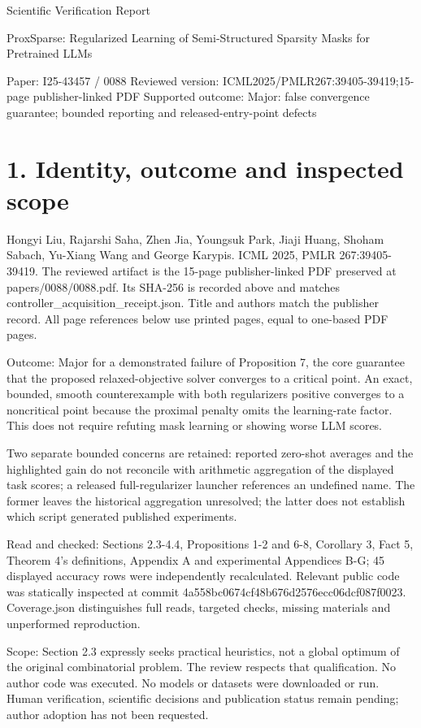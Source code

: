 \documentclass[10pt]{article}
\begin{document}
Scientific Verification Report\par
ProxSparse: Regularized Learning of Semi-Structured Sparsity Masks for Pretrained LLMs\par
Paper: I25-43457 / 0088
Reviewed version: ICML2025/PMLR267:39405-39419;15-page publisher-linked PDF
Supported outcome: Major: false convergence guarantee; bounded reporting and released-entry-point defects\par
\section*{1. Identity, outcome and inspected scope}
Hongyi Liu, Rajarshi Saha, Zhen Jia, Youngsuk Park, Jiaji Huang, Shoham Sabach, Yu-Xiang Wang and George Karypis. ICML 2025, PMLR 267:39405-39419. The reviewed artifact is the 15-page publisher-linked PDF preserved at papers/0088/0088.pdf. Its SHA-256 is recorded above and matches controller\_acquisition\_receipt.json. Title and authors match the publisher record. All page references below use printed pages, equal to one-based PDF pages.\par
Outcome: Major for a demonstrated failure of Proposition 7, the core guarantee that the proposed relaxed-objective solver converges to a critical point. An exact, bounded, smooth counterexample with both regularizers positive converges to a noncritical point because the proximal penalty omits the learning-rate factor. This does not require refuting mask learning or showing worse LLM scores.\par
Two separate bounded concerns are retained: reported zero-shot averages and the highlighted gain do not reconcile with arithmetic aggregation of the displayed task scores; a released full-regularizer launcher references an undefined name. The former leaves the historical aggregation unresolved; the latter does not establish which script generated published experiments.\par
Read and checked: Sections 2.3-4.4, Propositions 1-2 and 6-8, Corollary 3, Fact 5, Theorem 4’s definitions, Appendix A and experimental Appendices B-G; 45 displayed accuracy rows were independently recalculated. Relevant public code was statically inspected at commit 4a558bc0674cf48b676d2576ecc06dcf087f0023. Coverage.json distinguishes full reads, targeted checks, missing materials and unperformed reproduction.\par
Scope: Section 2.3 expressly seeks practical heuristics, not a global optimum of the original combinatorial problem. The review respects that qualification. No author code was executed. No models or datasets were downloaded or run. Human verification, scientific decisions and publication status remain pending; author adoption has not been requested.\par
\end{document}
